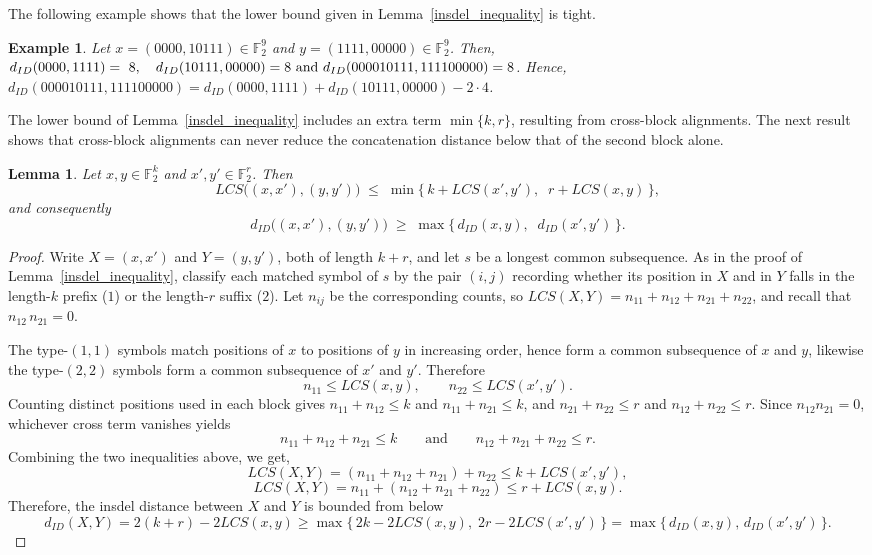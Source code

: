 \documentclass[11 pt]{article}
\numberwithin{equation}{section}
\newtheorem{lemma}[theorem]{Lemma}
\newtheorem{example}[theorem]{Example}
\begin{document}
    The following example shows that the lower bound given in Lemma~\ref{insdel_inequality} is tight.
    
    \begin{example}
        Let $x = (0000, 10111) \in \mathbb{F}_2^{9}$ and $y = (1111,00000) \in \mathbb{F}_2^{9}$. Then,
        $d_{ID}(0000,1111) =~8,\\ \quad d_{ID}(10111,00000)= 8 \text{ and } d_{ID}(000010111, 111100000) = 8$. 
        Hence, $d_{ID}(000010111, 111100000) = d_{ID}(0000,1111) + d_{ID}(10111,00000) - 2\cdot4$.
    \end{example}

    The lower bound of Lemma~\ref{insdel_inequality} includes an extra term $\min\{k,r\}$, resulting from cross-block alignments. The next result shows that cross-block alignments can never reduce the concatenation distance below that of the second block alone. 

    \begin{lemma}
    \label{lem:block-distance}
    Let $x,y\in\mathbb{F}_2^{k}$ and $x',y'\in\mathbb{F}_2^{r}$. Then
    \[
    LCS\big((x,x'),(y,y')\big)
    \;\le\;
    \min\big\{\, k+LCS(x',y'),\;\;
                 r+LCS(x,y) \,\big\},
    \]
    and consequently
    \[
    d_{ID}\big((x,x'),(y,y')\big)
    \;\ge\;
    \max\big\{\, d_{ID}(x,y),\;\; d_{ID}(x',y') \,\big\}.
    \]
    \end{lemma}

    \begin{proof}
    Write $X=(x,x')$ and $Y=(y,y')$, both of length $k+r$, and let $s$ be a longest common subsequence. As in the proof of Lemma~\ref{insdel_inequality}, classify each matched symbol of $s$ by the pair $(i,j)$ recording whether its position in $X$ and in $Y$ falls in the length-$k$ prefix ($1$) or the length-$r$ suffix ($2$). Let $n_{ij}$ be the corresponding counts, so $LCS(X,Y)=n_{11}+n_{12}+n_{21}+n_{22}$, and recall that $n_{12}\,n_{21}=0$.

    The type-$(1,1)$ symbols match positions of $x$ to positions of $y$ in increasing order, hence form a common subsequence of $x$ and $y$, likewise the type-$(2,2)$ symbols form a common subsequence of $x'$ and $y'$. Therefore
    \[
    n_{11}\le LCS(x,y),
    \qquad
    n_{22}\le LCS(x',y').
    \]
    Counting distinct positions used in each block gives $n_{11}+n_{12}\le k$ and $n_{11}+n_{21}\le k$, and $n_{21}+n_{22}\le r$ and $n_{12}+n_{22}\le r$. Since $n_{12}n_{21}=0$, whichever cross term vanishes yields
    \[
    n_{11}+n_{12}+n_{21}\le k
    \qquad\text{and}\qquad
    n_{12}+n_{21}+n_{22}\le r .
    \]
    Combining the two inequalities above, we get,
    \[
    LCS(X,Y)=(n_{11}+n_{12}+n_{21})+n_{22}\le k+LCS(x',y'),
    \]
    \[
    LCS(X,Y)=n_{11}+(n_{12}+n_{21}+n_{22})\le r+LCS(x,y).
    \]
    Therefore, the insdel distance between $X$ and $Y$ is bounded from below 
    \[
    d_{ID}(X,Y)=2(k+r)-2LCS(x,y)
    \ge\max\{\,2k-2LCS(x,y),\;2r-2LCS(x',y')\,\}
    =\max\{\,d_{ID}(x,y),\,d_{ID}(x',y')\,\}. 
    \]
\end{proof}
\end{document}
